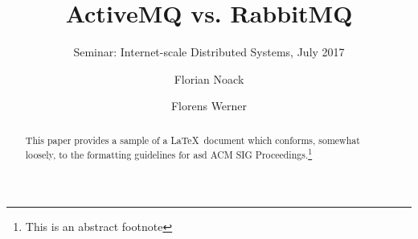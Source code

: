 \documentclass[sigconf]{acmart}
\begin{document}
\title{ActiveMQ vs. RabbitMQ}
\subtitle{Seminar: Internet-scale Distributed Systems, July 2017}


\author{Florian Noack}

\author{Florens Werner}




\begin{abstract}
This paper provides a sample of a \LaTeX\ document which conforms,
somewhat loosely, to the formatting guidelines for asd
ACM SIG Proceedings.\footnote{This is an abstract footnote}
\end{abstract}


\maketitle




 
\end{document}

